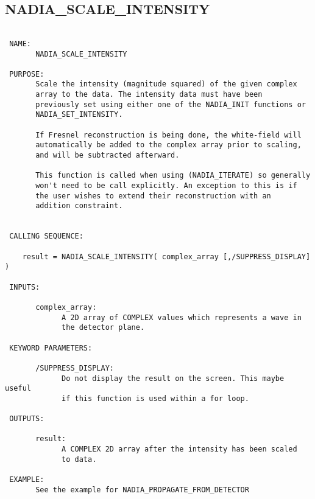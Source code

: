   
 
\subsection{NADIA\_SCALE\_INTENSITY}
\begin{verbatim}

 NAME:
       NADIA_SCALE_INTENSITY

 PURPOSE:
       Scale the intensity (magnitude squared) of the given complex
       array to the data. The intensity data must have been
       previously set using either one of the NADIA_INIT functions or
       NADIA_SET_INTENSITY.

       If Fresnel reconstruction is being done, the white-field will
       automatically be added to the complex array prior to scaling,
       and will be subtracted afterward.
       
       This function is called when using (NADIA_ITERATE) so generally
       won't need to be call explicitly. An exception to this is if
       the user wishes to extend their reconstruction with an
       addition constraint.


 CALLING SEQUENCE:

	result = NADIA_SCALE_INTENSITY( complex_array [,/SUPPRESS_DISPLAY] )

 INPUTS:

       complex_array:
             A 2D array of COMPLEX values which represents a wave in
             the detector plane.

 KEYWORD PARAMETERS:

       /SUPPRESS_DISPLAY:
             Do not display the result on the screen. This maybe useful
             if this function is used within a for loop. 

 OUTPUTS:

       result:
             A COMPLEX 2D array after the intensity has been scaled
             to data.

 EXAMPLE:
       See the example for NADIA_PROPAGATE_FROM_DETECTOR

\end{verbatim}






  
 
